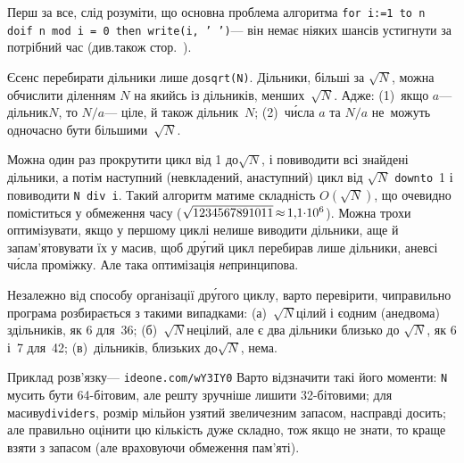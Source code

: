 \Tutorial	Перш за все, слід розуміти, що основна проблема алгоритма \texttt{for \mbox{i:=1 to n} do\linebreak[2] if \mbox{n mod i = 0} then \mbox{write(i, ' ')}}\nolinebreak[3] --- він не\nolinebreak[3] має ніяких шансів устигнути за потрібний час (див.\nolinebreak[3] також стор.~\pageref{text:first-example-how-to-see-algo-will-not-fit-in-time-limit}).

\label{text:about-sqrt-n-in-divisors-list}
Є\nolinebreak[3] сенс перебирати дільники лише до\nolinebreak[2] \verb"sqrt(N)". Дільники, більші за $\sqrt{N}$, можна обчислити діленням $N$ на якийсь із дільників, менших~$\sqrt{N}$. Адже: (1)~якщо $a$\nolinebreak[3] --- дільник\nolinebreak[3] $N$, то $N/a$\nolinebreak[3] --- ціле, й також дільник~$N$; (2)~ч\'{и}сла $a$ та $N/a$ не~можуть одночасно бути більшими~$\sqrt{N}$. 

Можна один раз прокрутити цикл від 1 до\nolinebreak[3] $\sqrt{N}$, і повиводити всі знайдені дільники, а потім наступний (не\nolinebreak[3] вкладений, а\nolinebreak[3] наступний) цикл від $\sqrt{N}$ \texttt{downto}~1 і повиводити \verb"N div i". Такий алгоритм матиме складність $O(\sqrt{N})$, що очевидно поміститься у обмеження часу ($\sqrt{1234567891011}\dib{{\approx}}{1{,}1{\cdot}10^6}$). Можна трохи оптимізувати, якщо у першому циклі не\nolinebreak[3] лише виводити дільники, а\nolinebreak[3] ще й запам'ятовувати їх у масив, щоб др\'{у}гий цикл перебирав лише дільники, а\nolinebreak[3] не\nolinebreak[3] всі ч\'{и}сла проміжку. Але така оптимізація \emph{не}\nolinebreak[3] принципова.

Незалежно від способу організації др\'{у}гого циклу, варто перевірити, чи\nolinebreak[3] правильно програма розбирається з такими випадками: (а)~$\sqrt{N}$\nolinebreak[1] цілий і є\nolinebreak[2] одним (а\nolinebreak[3] не\nolinebreak[3] двома) з\nolinebreak[2] дільників, як 6 для~36;
(б)~$\sqrt{N}$\nolinebreak[1] не\nolinebreak[3] цілий, але є два дільники близько до $\sqrt{N}$, як 6 і~7 для~42;
(в)~дільників, близьких до\nolinebreak[3] $\sqrt{N}$, нема.

Приклад розв'язку\nolinebreak[3] --- \verb"ideone.com/wY3IY0"\hspace{0.5emplus 1em}
Варто відзначити такі його моменти: \texttt{N} мусить бути 64-\nolinebreak[3]бітовим, але решту зручніше лишити 32-\nolinebreak[3]бітовими;
для масиву\nolinebreak[3] \texttt{dividers}, розмір мільйон узятий з\nolinebreak[3] величезним запасом, насправді досить; але правильно оцінити цю кількість дуже складно, тож якщо не знати, то краще взяти з запасом (але враховуючи обмеження пам'яті).